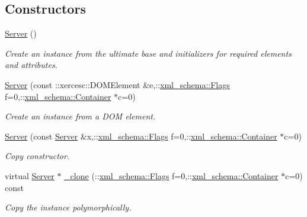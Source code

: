 \subsection*{Constructors}
\begin{DoxyCompactItemize}
\item 
\hypertarget{classopenstack_1_1xml_1_1Server_a54eb2397e883c4c86e8b992852affb9c}{
\hyperlink{classopenstack_1_1xml_1_1Server_a54eb2397e883c4c86e8b992852affb9c}{Server} ()}
\label{classopenstack_1_1xml_1_1Server_a54eb2397e883c4c86e8b992852affb9c}

\begin{DoxyCompactList}\small\item\em Create an instance from the ultimate base and initializers for required elements and attributes. \item\end{DoxyCompactList}\item 
\hyperlink{classopenstack_1_1xml_1_1Server_a1d436ff14f1641608dd986f14191d73a}{Server} (const ::xercesc::DOMElement \&e,::\hyperlink{namespacexml__schema_affb4c227cbd9aa7453dd1dc5a1401943}{xml\_\-schema::Flags} f=0,::\hyperlink{namespacexml__schema_a333dea2213742aea47a37532dec4ec27}{xml\_\-schema::Container} $\ast$c=0)
\begin{DoxyCompactList}\small\item\em Create an instance from a DOM element. \item\end{DoxyCompactList}\item 
\hyperlink{classopenstack_1_1xml_1_1Server_a3b093aae1ed2e3b78a1e7f8e7274af9b}{Server} (const \hyperlink{classopenstack_1_1xml_1_1Server}{Server} \&x,::\hyperlink{namespacexml__schema_affb4c227cbd9aa7453dd1dc5a1401943}{xml\_\-schema::Flags} f=0,::\hyperlink{namespacexml__schema_a333dea2213742aea47a37532dec4ec27}{xml\_\-schema::Container} $\ast$c=0)
\begin{DoxyCompactList}\small\item\em Copy constructor. \item\end{DoxyCompactList}\item 
virtual \hyperlink{classopenstack_1_1xml_1_1Server}{Server} $\ast$ \hyperlink{classopenstack_1_1xml_1_1Server_acdf954423af7484b23e016d481c915b7}{\_\-clone} (::\hyperlink{namespacexml__schema_affb4c227cbd9aa7453dd1dc5a1401943}{xml\_\-schema::Flags} f=0,::\hyperlink{namespacexml__schema_a333dea2213742aea47a37532dec4ec27}{xml\_\-schema::Container} $\ast$c=0) const 
\begin{DoxyCompactList}\small\item\em Copy the instance polymorphically. \item\end{DoxyCompactList}\end{DoxyCompactItemize}


